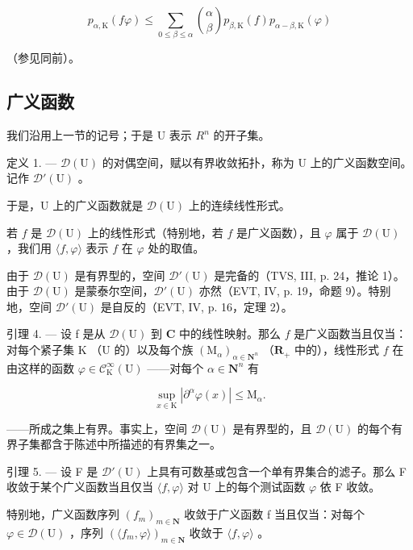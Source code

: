 \[
p _ {\alpha , \mathrm{K}} (f \varphi) \leqslant \sum_ {0 \leqslant \beta \leqslant \alpha} \binom {\alpha} {\beta} p _ {\beta , \mathrm{K}} (f) p _ {\alpha - \beta , \mathrm{K}} (\varphi)
\]

（参见同前）。

\subsection{广义函数}

我们沿用上一节的记号；于是 U 表示 \(R^{n}\) 的开子集。

定义 1. --- \(\mathcal{D}(\mathrm{U})\) 的对偶空间，赋以有界收敛拓扑，称为 U 上的广义函数空间。记作 \(\mathcal{D}'(\mathrm{U})\) 。

于是，U 上的广义函数就是 \(\mathcal{D}(\mathrm{U})\) 上的连续线性形式。

若 \(f\) 是 \(\mathcal{D}(\mathrm{U})\) 上的线性形式（特别地，若 \(f\) 是广义函数），且 \(\varphi\) 属于 \(\mathcal{D}(\mathrm{U})\) ，我们用 \(\langle f, \varphi \rangle\) 表示 \(f\) 在 \(\varphi\) 处的取值。

由于 \(\mathcal{D}(\mathrm{U})\) 是有界型的，空间 \(\mathcal{D}'(\mathrm{U})\) 是完备的（TVS, III, p. 24，推论 1）。由于 \(\mathcal{D}(\mathrm{U})\) 是蒙泰尔空间，\(\mathcal{D}'(\mathrm{U})\) 亦然（EVT, IV, p. 19，命题 9）。特别地，空间 \(\mathcal{D}'(\mathrm{U})\) 是自反的（EVT, IV, p. 16，定理 2）。

引理 4. --- 设 f 是从 \(\mathcal{D}(\mathrm{U})\) 到 \(\mathbf{C}\) 中的线性映射。那么 \(f\) 是广义函数当且仅当：对每个紧子集 \(\mathrm{K}\) （\(\mathrm{U}\) 的）以及每个族 \((\mathrm{M}_{\alpha})_{\alpha \in \mathbf{N}^{n}}\) （\(\mathbf{R}_{+}\) 中的），线性形式 \(f\) 在由这样的函数 \(\varphi \in \mathcal{C}_{\mathrm{K}}^{\infty}(\mathrm{U})\) ——对每个 \(\alpha \in \mathbf{N}^{n}\) 有

\[
\sup _ {x \in \mathrm{K}} | \partial^ {\alpha} \varphi (x) | \leqslant \mathrm{M} _ {\alpha}.
\]

——所成之集上有界。事实上，空间 \(\mathcal{D}(\mathrm{U})\) 是有界型的，且 \(\mathcal{D}(\mathrm{U})\) 的每个有界子集都含于陈述中所描述的有界集之一。

引理 5. --- 设 F 是 \(\mathcal{D}'(\mathrm{U})\) 上具有可数基或包含一个单有界集合的滤子。那么 F 收敛于某个广义函数当且仅当 \(\langle f, \varphi \rangle\) 对 U 上的每个测试函数 \(\varphi\) 依 F 收敛。

特别地，广义函数序列 \((f_{m})_{m\in\mathbf{N}}\) 收敛于广义函数 f 当且仅当：对每个 \(\varphi\in\mathcal{D}(\mathrm{U})\) ，序列 \((\langle f_{m},\varphi\rangle)_{m\in\mathbf{N}}\) 收敛于 \(\langle f,\varphi\rangle\) 。

